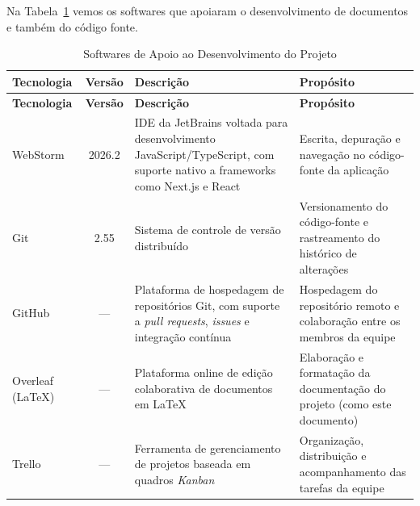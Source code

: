 
Na Tabela~\ref{tabela-software} vemos os softwares que apoiaram o desenvolvimento de documentos e também do código fonte.

\begin{footnotesize}
\begin{longtable}{|p{2.5cm}|c|p{5cm}|p{5.5cm}|}
	\caption{Softwares de Apoio ao Desenvolvimento do Projeto}	
	\label{tabela-software}\\\hline
	
	\rowcolor{lightgray}
	\textbf{Tecnologia} & \textbf{Versão} & \textbf{Descrição} & \textbf{Propósito} \\\hline 
	\endfirsthead
	\hline
	\rowcolor{lightgray}
	\textbf{Tecnologia} & \textbf{Versão} & \textbf{Descrição} & \textbf{Propósito} \\\hline 
	\endhead
		
	WebStorm & 2026.2 & IDE da JetBrains voltada para desenvolvimento JavaScript/TypeScript, com suporte nativo a frameworks como Next.js e React & Escrita, depuração e navegação no código-fonte da aplicação \\ \hline
	Git & 2.55 & Sistema de controle de versão distribuído & Versionamento do código-fonte e rastreamento do histórico de alterações \\ \hline
	GitHub & --- & Plataforma de hospedagem de repositórios Git, com suporte a \textit{pull requests}, \textit{issues} e integração contínua & Hospedagem do repositório remoto e colaboração entre os membros da equipe \\ \hline
	Overleaf (LaTeX) & --- & Plataforma online de edição colaborativa de documentos em LaTeX & Elaboração e formatação da documentação do projeto (como este documento) \\ \hline
	Trello & --- & Ferramenta de gerenciamento de projetos baseada em quadros \textit{Kanban} & Organização, distribuição e acompanhamento das tarefas da equipe \\ \hline
\end{longtable}
\end{footnotesize}